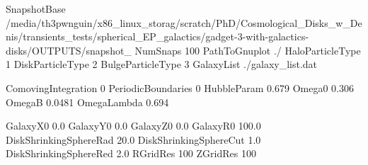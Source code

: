 %
%



SnapshotBase     /media/th3pwnguin/x86_linux_storag/scratch/PhD/Cosmological_Disks_w_Denis/transients_tests/spherical_EP_galactics/gadget-3-with-galactics-disks/OUTPUTS/snapshot_
NumSnaps           100
PathToGnuplot      ./
HaloParticleType   1
DiskParticleType   2
BulgeParticleType  3
GalaxyList         ./galaxy_list.dat


ComovingIntegration    0
PeriodicBoundaries     0
HubbleParam            0.679
Omega0                 0.306
OmegaB                 0.0481
OmegaLambda            0.694


GalaxyX0                0.0
GalaxyY0                0.0
GalaxyZ0                0.0
GalaxyR0                100.0
DiskShrinkingSphereRad  20.0
DiskShrinkingSphereCut  1.0
DiskShrinkingSphereRed  2.0
RGridRes                100
ZGridRes                100
